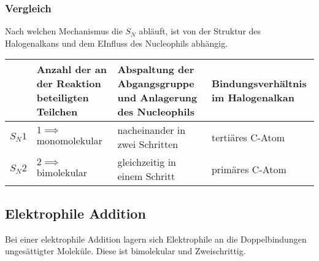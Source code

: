\documentclass[a4paper]{article}
\begin{document}
\subsubsection{Vergleich}
Nach welchen Mechanismus die $S_N$ abläuft, ist von der Struktur des Halogenalkans und dem EInfluss des
Nucleophils abhängig. \\
\begin{center}
\begin{tabular}{c | p{27.5mm} | p{27.5mm} | p{27.5mm} |}
    \quad &Anzahl der an der Reaktion beteiligten Teilchen &Abspaltung der Abgangsgruppe und Anlagerung des Nucleophils &Bindungsverhältnis im Halogenalkan \\ \hline
    $S_N1$ &$1 \implies$ monomolekular &nacheinander in zwei Schritten &tertiäres C-Atom \\ \hline
    $S_N2$ &$2 \implies$ bimolekular &gleichzeitig in einem Schritt &primäres C-Atom
\end{tabular}
\end{center}

\subsection{Elektrophile Addition}
Bei einer elektrophile Addition lagern sich Elektrophile an die Doppelbindungen ungesättigter Moleküle.
Diese ist bimolekular und Zweischrittig.
\end{document}
